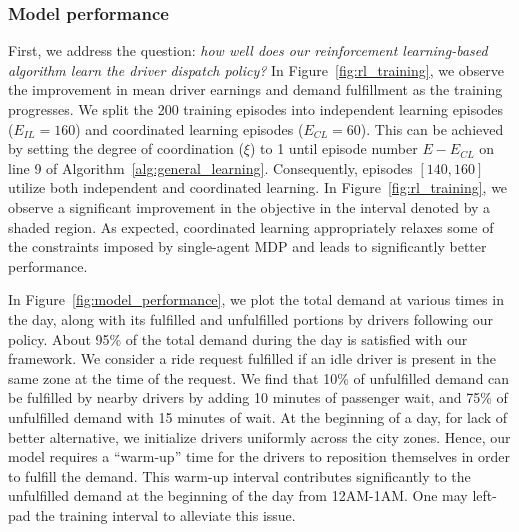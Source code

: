 \subsubsection{Model performance}
First, we address the question: \textit{how well does our reinforcement
    learning-based algorithm learn the driver dispatch policy?}
In Figure~\ref{fig:rl_training}, we observe the improvement in mean driver 
    earnings and demand fulfillment as the training progresses. 
We split the 200 training episodes into independent learning episodes
    ($E_{IL}=160$) and coordinated learning episodes ($E_{CL}=60$). 
This can be achieved by setting the degree of coordination ($\xi$) to 1 until 
episode number $E - E_{CL}$ on line 9 of Algorithm~\ref{alg:general_learning}.
Consequently, episodes $[140, 160]$ utilize both independent and
    coordinated learning. 
In Figure~\ref{fig:rl_training}, we
    observe a significant improvement in the objective in the interval 
    denoted by a shaded region. 
As expected, coordinated learning appropriately relaxes some of the constraints imposed by 
    single-agent MDP and leads to significantly better performance.

In Figure~\ref{fig:model_performance}, we plot the total demand at various 
    times in the day, along with its fulfilled and unfulfilled portions
    by drivers following our policy. 
About 95\% of the total demand during the day is
    satisfied with our framework. 
We consider a ride request fulfilled if an idle driver is present in the 
    same zone at the time of the request. 
We find that 10\% of unfulfilled demand can be fulfilled by nearby drivers by adding 
    10 minutes of passenger wait, and 75\% of unfulfilled demand with 15 minutes of
    wait.
At the beginning of a day, 
for lack of better alternative, 
    we initialize drivers 
    uniformly across the city zones. 
Hence, our model requires a ``warm-up'' time for the drivers to reposition
    themselves in order to fulfill the demand. 
This warm-up interval contributes significantly to the unfulfilled
    demand at the beginning of the day from 12AM-1AM. 
One may left-pad the training interval to alleviate this issue.

